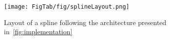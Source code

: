 \begin{figure}[t]
\centering
\texttt{[image: FigTab/fig/splineLayout.png]}
\caption{Layout of a spline following the architecture presented in~\autoref{fig:implementation}}
\label{fig:splinelayout}
\vspace{-2ex}
\end{figure}